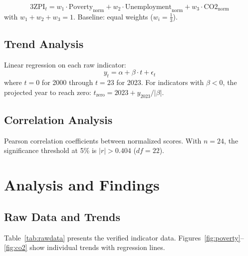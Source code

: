 \documentclass[12pt,a4paper]{article}
\begin{document}
\begin{equation}
\text{3ZPI}_t = w_1 \cdot \text{Poverty}_{\text{norm}} + w_2 \cdot \text{Unemployment}_{\text{norm}} + w_3 \cdot \text{CO2}_{\text{norm}}
\end{equation}
with $w_1 + w_2 + w_3 = 1$. Baseline: equal weights ($w_i = \frac{1}{3}$).

\subsection{Trend Analysis}

Linear regression on each raw indicator:
\begin{equation}
y_t = \alpha + \beta \cdot t + \epsilon_t
\end{equation}
where $t = 0$ for 2000 through $t = 23$ for 2023. For indicators with $\beta < 0$, the projected year to reach zero: $t_{\text{zero}} = 2023 + y_{2023}/|\beta|$.

\subsection{Correlation Analysis}

Pearson correlation coefficients between normalized scores. With $n = 24$, the significance threshold at 5\% is $|r| > 0.404$ ($df = 22$).

\section{Analysis and Findings}

\subsection{Raw Data and Trends}

Table~\ref{tab:rawdata} presents the verified indicator data. Figures~\ref{fig:poverty}--\ref{fig:co2} show individual trends with regression lines.
\end{document}
